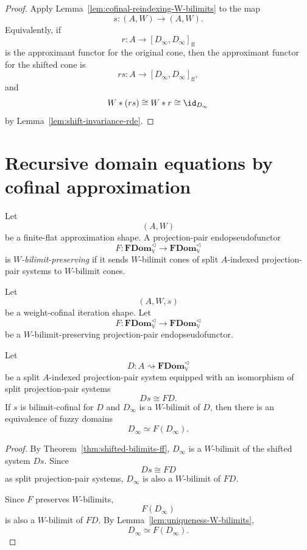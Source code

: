 \begin{proof}
Apply Lemma~\ref{lem:cofinal-reindexing-W-bilimits} to the map
\[
    s:(A,W)\to(A,W).
\]
Equivalently, if
\[
    r:A\to[D_\infty,D_\infty]_{\mathrm{ff}}
\]
is the approximant functor for the original cone, then the approximant functor
for the shifted cone is
\[
    rs:A\to[D_\infty,D_\infty]_{\mathrm{ff}},
\]
and
\[
    W*(rs)
    \cong
    W*r
    \cong
    \id_{D_\infty}
\]
by Lemma~\ref{lem:shift-invariance-rde}.
\end{proof}

\section{Recursive domain equations by cofinal approximation}
\label{sec:rde-by-cofinal-approximation}

\begin{definition}
\label{def:W-bilimit-preserving-endofunctor}
Let
\[
    (A,W)
\]
be a finite-flat approximation shape.  A projection-pair endopseudofunctor
\[
    F:\mathbf{FDom}_{\mathbb V}^{\triangleleft}
      \to
      \mathbf{FDom}_{\mathbb V}^{\triangleleft}
\]
is \emph{\(W\)-bilimit-preserving} if it sends \(W\)-bilimit cones of split
\(A\)-indexed projection-pair systems to \(W\)-bilimit cones.
\end{definition}

\begin{theorem}
\label{thm:finite-flat-cofinal-rde}
Let
\[
    (A,W,s)
\]
be a weight-cofinal iteration shape.  Let
\[
    F:\mathbf{FDom}_{\mathbb V}^{\triangleleft}
      \to
      \mathbf{FDom}_{\mathbb V}^{\triangleleft}
\]
be a \(W\)-bilimit-preserving projection-pair endopseudofunctor.

Let
\[
    D:A\rightsquigarrow\mathbf{FDom}_{\mathbb V}^{\triangleleft}
\]
be a split \(A\)-indexed projection-pair system equipped with an isomorphism of
split projection-pair systems
\[
    Ds\cong FD.
\]
If \(s\) is bilimit-cofinal for \(D\) and \(D_\infty\) is a \(W\)-bilimit of
\(D\), then there is an equivalence of fuzzy domains
\[
    D_\infty\simeq F(D_\infty).
\]
\end{theorem}

\begin{proof}
By Theorem~\ref{thm:shifted-bilimits-ff}, \(D_\infty\) is a \(W\)-bilimit of
the shifted system \(Ds\).  Since
\[
    Ds\cong FD
\]
as split projection-pair systems, \(D_\infty\) is also a \(W\)-bilimit of
\(FD\).

Since \(F\) preserves \(W\)-bilimits,
\[
    F(D_\infty)
\]
is also a \(W\)-bilimit of \(FD\).  By
Lemma~\ref{lem:uniqueness-W-bilimits},
\[
    D_\infty\simeq F(D_\infty).
\]
\end{proof}

